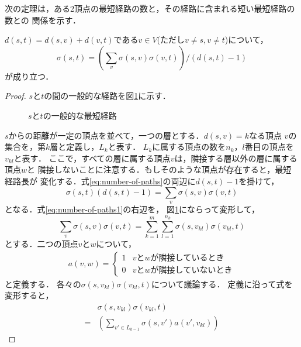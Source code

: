 次の定理は，ある2頂点の最短経路の数と，その経路に含まれる短い最短経路の数との
関係を示す．
\begin{theorem}
  \label{theorem:number-of-paths}
  $d(s,t)=d(s,v)+d(v,t)$である$v\in V$(ただし$v\neq s,v\neq t$)について，
  \begin{equation}
    \label{eq:number-of-paths}
    \sigma(s,t)=\left(
    \sum_{v}\sigma(s,v)\sigma(v,t)\right) / (d(s,t)-1)
  \end{equation}
  が成り立つ．
\end{theorem}
\begin{proof}
  $s$と$t$の間の一般的な経路を図\ref{fig:proof-number-of-paths}に示す．
  \begin{figure}
    \centering
    \def\svgwidth{.5\columnwidth}
    
    \caption{$s$と$t$の一般的な最短経路}
    \label{fig:proof-number-of-paths}
  \end{figure}
  $s$からの距離が一定の頂点を並べて，一つの層とする．$d(s,v)=k$なる頂点
  $v$の集合を，第$k$層と定義し，$L_k$と表す．
  $L_k$に属する頂点の数を$n_k$，$l$番目の頂点を$v_{kl}$と表す．
  ここで，すべての層に属する頂点$v$は，隣接する層以外の層に属する頂点$w$と
  隣接しないことに注意する．もしそのような頂点が存在すると，最短経路長が
  変化する．式\ref{eq:number-of-paths}の両辺に$d(s,t)-1$を掛けて，
  \begin{equation}
    \sigma(s,t)(d(s,t)-1)=\sum_{v}\sigma(s,v)\sigma(v,t)
    \label{eq:number-of-paths1}
  \end{equation}
  となる．式\ref{eq:number-of-paths1}の右辺を，
  図\ref{fig:proof-number-of-paths}にならって変形して，
  \begin{equation}
    \sum_{v}\sigma(s,v)\sigma(v,t)=
    \sum_{k=1}^m\sum_{l=1}^{n_k}\sigma(s,v_{kl})\sigma(v_{kl},t)
    \label{eq:number-of-paths2}
  \end{equation}
  とする．二つの頂点$v$と$w$について，
  \begin{align*}
    a(v,w)=
    \begin{cases}
      1 & vとwが隣接しているとき \\
      0 & vとwが隣接していないとき
    \end{cases}
  \end{align*}
  と定義する．
  各々の$\sigma(s,v_{kl})\sigma(v_{kl},t)$について議論する．
  定義に沿って式を変形すると，
  \begin{align}
    &\sigma(s,v_{kl})\sigma(v_{kl},t)\nonumber\\
    =&\left(\sum_{v'\in L_{k-1}}\sigma(s,v')a(v',v_{kl})\right)

\end{align}
\end{proof}
